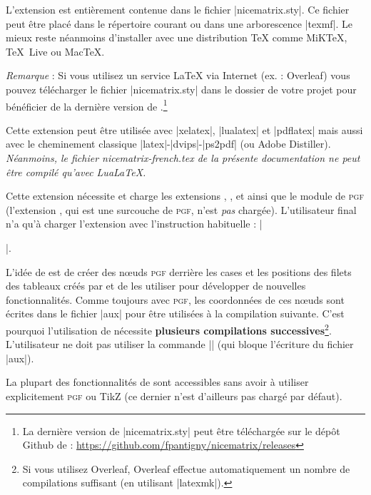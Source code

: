 \documentclass[dvipsnames]{article}%
\begin{document}
\vspace{1cm}

L'extension  est entièrement contenue dans le fichier
|nicematrix.sty|. Ce fichier peut être placé dans le répertoire courant ou dans
une arborescence |texmf|. Le mieux reste néanmoins d'installer 
avec une distribution TeX comme MiKTeX, TeX~Live ou MacTeX.

\medskip
\emph{Remarque} : Si vous utilisez un service LaTeX via Internet (ex. :
Overleaf) vous pouvez télécharger le fichier |nicematrix.sty| dans le dossier de
votre projet pour bénéficier de la dernière version de
.\footnote{La dernière version de |nicematrix.sty| peut
  être téléchargée sur le dépôt Github de  : \newline \small
  \url{https://github.com/fpantigny/nicematrix/releases}}

\medskip
Cette extension peut être utilisée avec |xelatex|, |lualatex| et |pdflatex| mais
aussi avec le cheminement classique |latex|-|dvips|-|ps2pdf| (ou Adobe
Distiller). \textsl{Néanmoins, le fichier nicematrix-french.tex de la présente
  documentation ne peut être compilé qu'avec LuaLaTeX.}

\medskip
Cette extension nécessite et charge les extensions , ,
 et  ainsi que le module  de \textsc{pgf}
(l'extension , qui est une surcouche de \textsc{pgf}, n'est \emph{pas}
chargée). L'utilisateur final n'a qu'à charger l'extension  avec
l'instruction habituelle : |\usepackage{nicematrix}|.


\medskip
L'idée de  est de créer des nœuds \textsc{pgf} derrière les
cases et les positions des filets des tableaux créés par  et de les
utiliser pour développer de nouvelles fonctionnalités. Comme toujours avec
\textsc{pgf}, les coordonnées de ces nœuds sont écrites dans le fichier |aux|
pour être utilisées à la compilation suivante. C'est pourquoi l'utilisation de
 nécessite \textbf{plusieurs compilations
  successives}\footnote{Si vous utilisez Overleaf, Overleaf effectue
  automatiquement un nombre de compilations suffisant (en utilisant |latexmk|).}. L'utilisateur ne doit
pas utiliser la commande |\nofiles| (qui bloque l'écriture du fichier |aux|). 

\medskip
La plupart des fonctionnalités de  sont accessibles sans avoir à
utiliser explicitement \textsc{pgf} ou TikZ (ce dernier n'est d'ailleurs pas
chargé par défaut).
\end{document}
